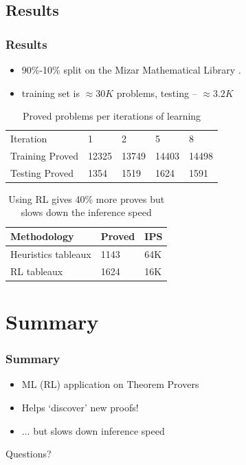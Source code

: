 \documentclass{beamer}
\begin{document}
\subsection{Results}

\begin{frame}
\frametitle{Results}
\begin{itemize}
    \item 90\%-10\% split on the Mizar Mathematical Library \citep{MML} .
    \item training set is $\approx 30K$ problems, testing -- $\approx 3.2K$
\end{itemize}
\begin{table}
\begin{tabular}{l l l l l}
\toprule
Iteration & 1 & 2 & 5 & 8 \\
Training Proved & 12325 & 13749 & 14403 & 14498\\
Testing Proved & 1354 &  1519 & 1624 & 1591\\
\bottomrule
\end{tabular}
\caption{Proved problems per iterations of learning}
\end{table}

\pause
\begin{table}
\begin{tabular}{l l l}
\toprule
\textbf{Methodology} & \textbf{Proved} & \textbf{IPS} \\
\midrule
Heuristics tableaux & 1143 & 64K \\
RL tableaux & 1624 & 16K \\

\bottomrule
\end{tabular}
\caption{Using RL gives 40\% more proves but slows down the inference speed}
\end{table}
\end{frame}

\section{Summary}

\begin{frame}
\frametitle{Summary}
\begin{itemize}
    \item ML (RL) application on Theorem Provers
    \item Helps `discover' new proofs!
    \item ... but slows down inference speed
\end{itemize}

\end{frame}
\begin{frame}
\Huge
\centering
Questions?
\end{frame}
\end{document}
